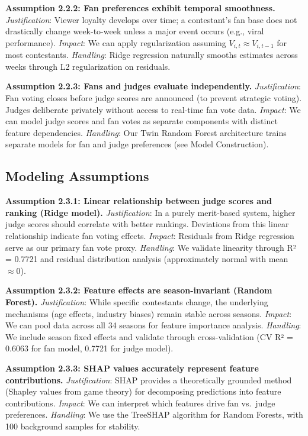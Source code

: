 \documentclass{mcmthesis}
\begin{document}
\textbf{Assumption 2.2.2: Fan preferences exhibit temporal smoothness.}
\textit{Justification}: Viewer loyalty develops over time; a contestant's fan base does not drastically change week-to-week unless a major event occurs (e.g., viral performance).
\textit{Impact}: We can apply regularization assuming $V_{i,t} \approx V_{i,t-1}$ for most contestants.
\textit{Handling}: Ridge regression naturally smooths estimates across weeks through L2 regularization on residuals.

\textbf{Assumption 2.2.3: Fans and judges evaluate independently.}
\textit{Justification}: Fan voting closes before judge scores are announced (to prevent strategic voting). Judges deliberate privately without access to real-time fan vote data.
\textit{Impact}: We can model judge scores and fan votes as separate components with distinct feature dependencies.
\textit{Handling}: Our Twin Random Forest architecture trains separate models for fan and judge preferences (see Model Construction).

\subsection{Modeling Assumptions}

\textbf{Assumption 2.3.1: Linear relationship between judge scores and ranking (Ridge model).}
\textit{Justification}: In a purely merit-based system, higher judge scores should correlate with better rankings. Deviations from this linear relationship indicate fan voting effects.
\textit{Impact}: Residuals from Ridge regression serve as our primary fan vote proxy.
\textit{Handling}: We validate linearity through R² = 0.7721 and residual distribution analysis (approximately normal with mean $\approx 0$).

\textbf{Assumption 2.3.2: Feature effects are season-invariant (Random Forest).}
\textit{Justification}: While specific contestants change, the underlying mechanisms (age effects, industry biases) remain stable across seasons.
\textit{Impact}: We can pool data across all 34 seasons for feature importance analysis.
\textit{Handling}: We include season fixed effects and validate through cross-validation (CV R² = 0.6063 for fan model, 0.7721 for judge model).

\textbf{Assumption 2.3.3: SHAP values accurately represent feature contributions.}
\textit{Justification}: SHAP provides a theoretically grounded method (Shapley values from game theory) for decomposing predictions into feature contributions.
\textit{Impact}: We can interpret which features drive fan vs.\ judge preferences.
\textit{Handling}: We use the TreeSHAP algorithm for Random Forests, with 100 background samples for stability.
\end{document}
